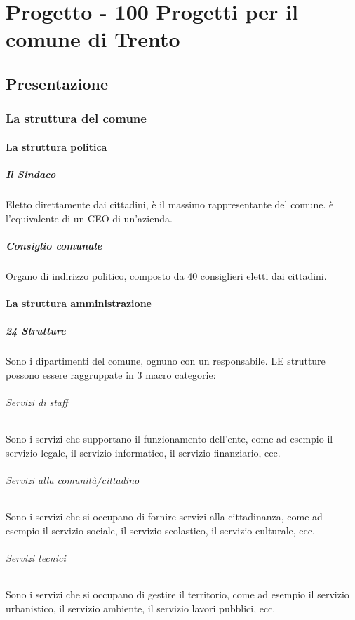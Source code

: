\chapter{Progetto - 100 Progetti per il comune di Trento}
    \section{Presentazione}
        \subsection{La struttura del comune}
            \subsubsection{La struttura politica}
                \paragraph{Il Sindaco} Eletto direttamente dai cittadini, è il massimo rappresentante del comune. è l'equivalente di un CEO di un'azienda.
                \paragraph{Consiglio comunale} Organo di indirizzo politico, composto da 40 consiglieri eletti dai cittadini.
                    \subsubsection{La struttura amministrazione}
                        \paragraph{24 Strutture} Sono i dipartimenti del comune, ognuno con un responsabile. LE strutture possono essere raggruppate in 3 macro categorie:
                            \subparagraph{Servizi di staff} Sono i servizi che supportano il funzionamento dell'ente, come ad esempio il servizio legale, il servizio informatico, il servizio finanziario, ecc.
                            \subparagraph{Servizi alla comunità/cittadino} Sono i servizi che si occupano di fornire servizi alla cittadinanza, come ad esempio il servizio sociale, il servizio scolastico, il servizio culturale, ecc.
                            \subparagraph{Servizi tecnici} Sono i servizi che si occupano di gestire il territorio, come ad esempio il servizio urbanistico, il servizio ambiente, il servizio lavori pubblici, ecc.
